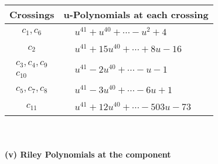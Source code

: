\documentclass[1p]{elsarticle_modified}
\theoremstyle{definition}
\begin{document}
\begin{tabular}{m{50pt}|m{274pt}}
Crossings & \hspace{64pt}u-Polynomials at each crossing \\
\hline $$\begin{aligned}c_{1},c_{6}\end{aligned}$$&$\begin{aligned}
&u^{41}+u^{40}+\cdots- u^2+4
\end{aligned}$\\
\hline $$\begin{aligned}c_{2}\end{aligned}$$&$\begin{aligned}
&u^{41}+15 u^{40}+\cdots+8 u-16
\end{aligned}$\\
\hline $$\begin{aligned}c_{3},c_{4},c_{9}\\c_{10}\end{aligned}$$&$\begin{aligned}
&u^{41}-2 u^{40}+\cdots- u-1
\end{aligned}$\\
\hline $$\begin{aligned}c_{5},c_{7},c_{8}\end{aligned}$$&$\begin{aligned}
&u^{41}-3 u^{40}+\cdots-6 u+1
\end{aligned}$\\
\hline $$\begin{aligned}c_{11}\end{aligned}$$&$\begin{aligned}
&u^{41}+12 u^{40}+\cdots-503 u-73
\end{aligned}$\\
\hline
\end{tabular}\\~\\
\newpage\renewcommand{\arraystretch}{1}
\flushleft \textbf{(v) Riley Polynomials at the component}\newline \\
\end{document}
